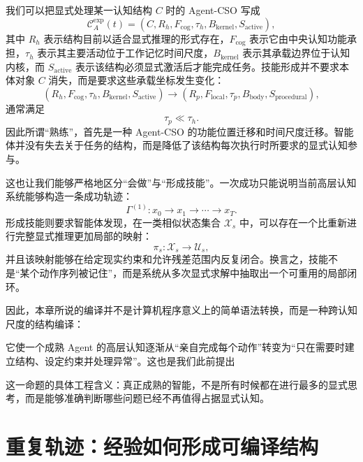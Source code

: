 我们可以把显式处理某一认知结构 $C$ 时的 Agent-CSO 写成
\[
\mathcal C^{\mathrm{exp}}_A(t)
=
\left(
C,
R_h,
F_{\mathrm{cog}},
\tau_h,
B_{\mathrm{kernel}},
S_{\mathrm{active}}
\right),
\]
其中 $R_h$ 表示结构目前以适合显式推理的形式存在，$F_{\mathrm{cog}}$ 表示它由中央认知功能承担，$\tau_h$ 表示其主要活动位于工作记忆时间尺度，$B_{\mathrm{kernel}}$ 表示其承载边界位于认知内核，而 $S_{\mathrm{active}}$ 表示该结构必须显式激活后才能完成任务。技能形成并不要求本体对象 $C$ 消失，而是要求这些承载坐标发生变化：
\[
(R_h,F_{\mathrm{cog}},\tau_h,B_{\mathrm{kernel}},S_{\mathrm{active}})
\longrightarrow
(R_p,F_{\mathrm{local}},\tau_p,B_{\mathrm{body}},S_{\mathrm{procedural}}),
\]
通常满足
\[
\tau_p \ll \tau_h.
\]
因此所谓“熟练”，首先是一种 Agent-CSO 的功能位置迁移和时间尺度迁移。智能体并没有失去关于任务的结构，而是降低了该结构每次执行时所要求的显式认知参与。

这也让我们能够严格地区分“会做”与“形成技能”。一次成功只能说明当前高层认知系统能够构造一条成功轨迹：
\[
\Gamma^{(1)}:
x_0\rightarrow x_1\rightarrow\cdots\rightarrow x_T.
\]
形成技能则要求智能体发现，在一类相似状态集合 $\mathcal X_s$ 中，可以存在一个比重新进行完整显式推理更加局部的映射：
\[
\pi_s:
\mathcal X_s
\rightarrow
\mathcal U_s,
\]
并且该映射能够在给定现实约束和允许残差范围内反复闭合。换言之，技能不是“某个动作序列被记住”，而是系统从多次显式求解中抽取出一个可重用的局部闭环。

因此，本章所说的编译并不是计算机程序意义上的简单语法转换，而是一种跨认知尺度的结构编译：
\begin{statementbox}
\centering
{}
\end{statementbox}
它使一个成熟 Agent 的高层认知逐渐从“亲自完成每个动作”转变为“只在需要时建立结构、设定约束并处理异常”。这也是我们此前提出
\begin{statementbox}
\centering
{}
\end{statementbox}
这一命题的具体工程含义：真正成熟的智能，不是所有时候都在进行最多的显式思考，而是能够准确判断哪些问题已经不再值得占据显式认知。

\section{重复轨迹：经验如何形成可编译结构}

